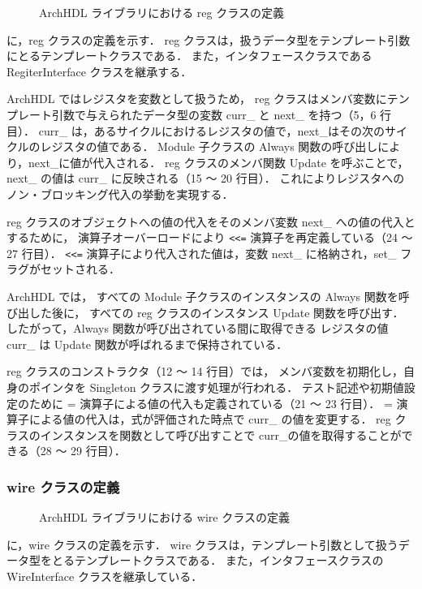 \begin{figure}[t]
 
 \caption{ArchHDL ライブラリにおける reg クラスの定義}
 \label{src:reg}
\end{figure}

 に，reg クラスの定義を示す．
reg クラスは，扱うデータ型をテンプレート引数にとるテンプレートクラスである．
また，インタフェースクラスである RegiterInterface クラスを継承する．

ArchHDL ではレジスタを変数として扱うため，
reg クラスはメンバ変数にテンプレート引数で与えられたデータ型の変数 curr\_ と next\_ を持つ（5，6 行目）．
curr\_ は，あるサイクルにおけるレジスタの値で，next\_はその次のサイクルのレジスタの値である．
Module 子クラスの Always 関数の呼び出しにより，next\_に値が代入される．
reg クラスのメンバ関数 Update を呼ぶことで，next\_ の値は curr\_ に反映される（15 ～ 20 行目）．
これによりレジスタへのノン・ブロッキング代入の挙動を実現する．

reg クラスのオブジェクトへの値の代入をそのメンバ変数 next\_ への値の代入とするために，
演算子オーバーロードにより \verb`<<=` 演算子を再定義している（24 ～ 27 行目）．
\verb`<<=` 演算子により代入された値は，変数 next\_ に格納され，set\_ フラグがセットされる．

ArchHDL では，
すべての Module 子クラスのインスタンスの Always 関数を呼び出した後に，
すべての reg クラスのインスタンス Update 関数を呼び出す．
したがって，Always 関数が呼び出されている間に取得できる
レジスタの値 curr\_ は Update 関数が呼ばれるまで保持されている．

reg クラスのコンストラクタ（12 ～ 14 行目）では，
メンバ変数を初期化し，自身のポインタを Singleton クラスに渡す処理が行われる．
テスト記述や初期値設定のために = 演算子による値の代入も定義されている（21 ～ 23 行目）．
= 演算子による値の代入は，式が評価された時点で curr\_ の値を変更する．
reg クラスのインスタンスを関数として呼び出すことで curr\_の値を取得することができる（28 ～ 29 行目）．

\subsubsection{wire クラスの定義}

\begin{figure}[t]
 
 \caption{ArchHDL ライブラリにおける wire クラスの定義}
 \label{src:wire}
\end{figure}

 に，wire クラスの定義を示す．
wire クラスは，テンプレート引数として扱うデータ型をとるテンプレートクラスである．
また，インタフェースクラスの WireInterface クラスを継承している．

